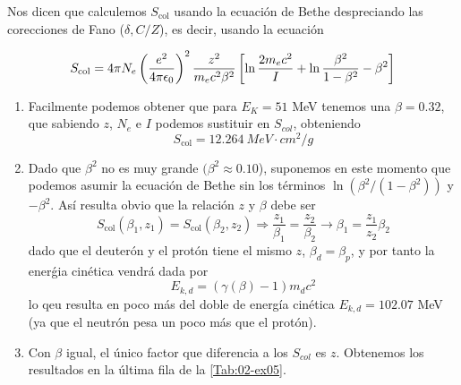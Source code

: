 Nos dicen que calculemos $S_{\text{col}}$ usando la ecuación de Bethe despreciando las corecciones de Fano ($\delta, C/Z$), es decir, usando la ecuación 

\begin{equation*}
S_\text{\text{col}} = 4\pi N_e \left( \frac{e^2}{4\pi \epsilon_0} \right)^2 
\frac{z^2}{m_e c^2 \beta^2} 
\left[ \ln \frac{2 m_e c^2}{I} + \ln \frac{\beta^2}{1 - \beta^2} - \beta^2  \right]
\end{equation*}

\begin{enumerate}[label=\alph*)]
    \item Facilmente podemos obtener que para $E_K=51$ MeV tenemos una $\beta = 0.32$, que sabiendo $z$, $N_e$ e $I$ podemos sustituir en $S_{col}$, obteniendo 
    \[ S_{\text{col}} = 12.264 \ \unit{MeV \cdot cm^2 / g}\]
    \item Dado que $\beta^2$ no es muy grande $(\beta^2 \approx 0.10$), suponemos en este momento que podemos asumir la ecuación de Bethe sin los términos $\ln(\beta^2/(1-\beta^2))$ y $-\beta^2$. Así resulta obvio que la relación $z$ y $\beta$ debe ser
    \begin{equation*}
        S_{\text{col}} (\beta_1,z_1) = S_{\text{col}} (\beta_2,z_2) \Rightarrow \frac{z_1}{\beta_1} = \frac{z_2}{\beta_2} \to \beta_1 = \frac{z_1}{z_2} \beta_2
    \end{equation*}
    dado que el deuterón y el protón tiene el mismo $z$, $\beta_d = \beta_p$, y por tanto la enerǵia cinética vendrá dada por 
    \begin{equation*}
        E_{k,d} = (\gamma(\beta)-1) m_d c^2
    \end{equation*}
    lo qeu resulta en poco más del doble de energía cinética $E_{k,d} = 102.07$ MeV (ya que el neutrón pesa un poco más que el protón). 
    \item Con $\beta$ igual, el único factor que diferencia a los $S_{col}$ es $z$. Obtenemos los resultados en la última fila de la \cref{Tab:02-ex05}.
\end{enumerate}

\begingroup
\makeatletter
\let\old@floatboxreset\@floatboxreset
\def\@floatboxreset{\old@floatboxreset\centering} %
\makeatother

\endgroup


